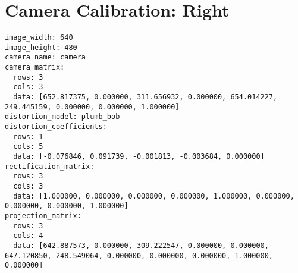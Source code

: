 \section{Camera Calibration: Right}
\begin{verbatim}
image_width: 640
image_height: 480
camera_name: camera
camera_matrix:
  rows: 3
  cols: 3
  data: [652.817375, 0.000000, 311.656932, 0.000000, 654.014227, 249.445159, 0.000000, 0.000000, 1.000000]
distortion_model: plumb_bob
distortion_coefficients:
  rows: 1
  cols: 5
  data: [-0.076846, 0.091739, -0.001813, -0.003684, 0.000000]
rectification_matrix:
  rows: 3
  cols: 3
  data: [1.000000, 0.000000, 0.000000, 0.000000, 1.000000, 0.000000, 0.000000, 0.000000, 1.000000]
projection_matrix:
  rows: 3
  cols: 4
  data: [642.887573, 0.000000, 309.222547, 0.000000, 0.000000, 647.120850, 248.549064, 0.000000, 0.000000, 0.000000, 1.000000, 0.000000]
\end{verbatim}


